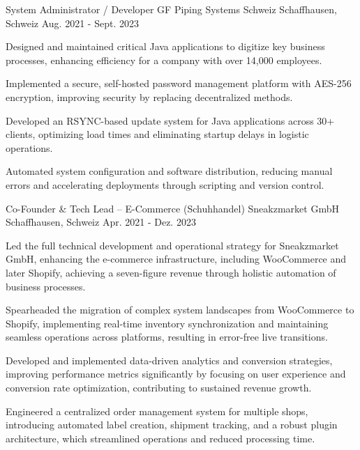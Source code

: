 \begin{cventries}
\cventry
  {System Administrator / Developer}
  {GF Piping Systems Schweiz}
  {Schaffhausen, Schweiz}
  {Aug. 2021 - Sept. 2023}
  {
    \begin{cvitems}
\item {Designed and maintained critical Java applications to digitize key business processes, enhancing efficiency for a company with over 14,000 employees.}
\item {Implemented a secure, self-hosted password management platform with AES-256 encryption, improving security by replacing decentralized methods.}
\item {Developed an RSYNC-based update system for Java applications across 30+ clients, optimizing load times and eliminating startup delays in logistic operations.}
\item {Automated system configuration and software distribution, reducing manual errors and accelerating deployments through scripting and version control.}
\end{cvitems}
  }

\cventry
  {Co-Founder \& Tech Lead – E-Commerce (Schuhhandel)}
  {Sneakzmarket GmbH}
  {Schaffhausen, Schweiz}
  {Apr. 2021 - Dez. 2023}
  {
    \begin{cvitems}
\item {Led the full technical development and operational strategy for Sneakzmarket GmbH, enhancing the e-commerce infrastructure, including WooCommerce and later Shopify, achieving a seven-figure revenue through holistic automation of business processes.}
\item {Spearheaded the migration of complex system landscapes from WooCommerce to Shopify, implementing real-time inventory synchronization and maintaining seamless operations across platforms, resulting in error-free live transitions.}
\item {Developed and implemented data-driven analytics and conversion strategies, improving performance metrics significantly by focusing on user experience and conversion rate optimization, contributing to sustained revenue growth.}
\item {Engineered a centralized order management system for multiple shops, introducing automated label creation, shipment tracking, and a robust plugin architecture, which streamlined operations and reduced processing time.}
\end{cvitems}
  }


\end{cventries}
